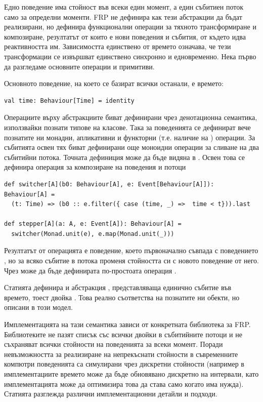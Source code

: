 Едно поведение има стойност във всеки един момент, а един събитиен поток само за определни моменти. FRP не дефинира как тези абстракции да бъдат реализирани, но дефинира функционални операции за тяхното трансформиране и композиране, резултатът от които е нови поведения и събития, от където идва реактивността им. Зависимостта единствено от времето означава, че тези трансформации се извършват единствено синхронно и едновременно. Нека първо да разгледаме основните операции и примитиви.

Основното поведение, на което се базират всички останали, е времето: 

\begin{lstlisting}
val time: Behaviour[Time] = identity
\end{lstlisting}

Операциите върху абстракциите биват дефинирани чрез денотационна семантика, използвайки познати типове на класове. Така за поведенията се дефинират вече познатите ни монадни, апликативни и функторни (т.е. наличие на ) операции. За събитията освен тях биват дефинирани още моноидни операции за сливане на два събитийни потока. Точната дефиниция може да бъде видяна в \cite{elliott2009PushPullFRP}. Освен това се дефинира операция за композиране на поведения и потоци 

\begin{lstlisting}
def switcher[A](b0: Behaviour[A], e: Event[Behaviour[A]]): Behaviour[A] =
  (t: Time) => (b0 :: e.filter({ case (time, _) =>  time < t})).last
  
def stepper[A](a: A, e: Event[A]): Behaviour[A] =
  switcher(Monad.unit(e), e.map(Monad.unit(_)))
\end{lstlisting}

Резултатът от операцията е поведение, което първоначално съвпада с поведението , но за всяко събитие в потока  променя стойността си с новото поведение от него. Чрез  може да бъде дефинирата по-простоата операция .

Статията дефинира и абстракция , представляваща единично събитие във времето, тоест двойка . Това реално съответства на познатите ни  обекти, но описани в този модел.

Имплементацията на тази семантика зависи от конкретната библиотека за FRP. Библиотеките не пазят списък със всички двойки в събитийните потоци и не съхраняват всички стойности на поведенията за всеки момент. Поради невъзможността за реализиране на непрекъснати стойности в съвременните компютри поведенията са симулирани чрез дискретни стойности (например в имплементациите времето може да бъде обновявано дискретно на интервали, като имплементацията може да оптимизира това да става само когато има нужда). Статията разглежда различни имплементационни детайли и подходи.

